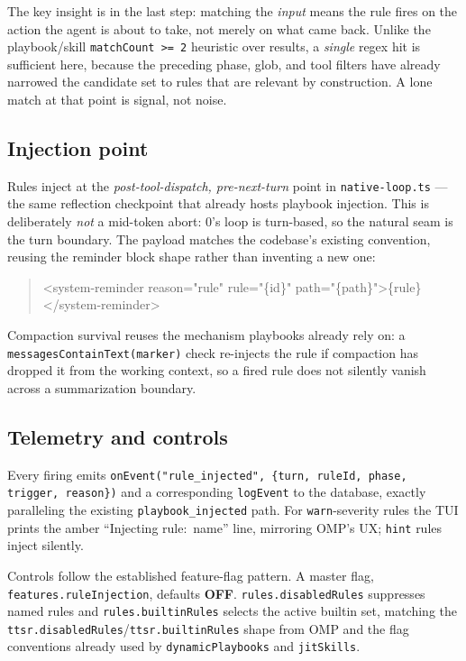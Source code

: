 \documentclass[11pt]{article}
\begin{document}
The key insight is in the last step: matching the \emph{input} means the rule
fires on the action the agent is about to take, not merely on what came back.
Unlike the playbook/skill \texttt{matchCount >= 2} heuristic over results, a
\emph{single} regex hit is sufficient here, because the preceding phase, glob, and
tool filters have already narrowed the candidate set to rules that are relevant
by construction. A lone match at that point is signal, not noise.

\subsection{Injection point}

Rules inject at the \emph{post-tool-dispatch, pre-next-turn} point in
\texttt{native-loop.ts} --- the same reflection checkpoint that already hosts
playbook injection. This is deliberately \emph{not} a mid-token abort: 0's
loop is turn-based, so the natural seam is the turn boundary. The payload matches
the codebase's existing convention, reusing the reminder block shape rather than
inventing a new one:

\begin{quote}\ttfamily
<system-reminder reason="rule" rule="\{id\}" path="\{path\}">\{rule\}</system-reminder>
\end{quote}

Compaction survival reuses the mechanism playbooks already rely on: a
\texttt{messagesContainText(marker)} check re-injects the rule if compaction has
dropped it from the working context, so a fired rule does not silently vanish
across a summarization boundary.

\subsection{Telemetry and controls}

Every firing emits \texttt{onEvent("rule\_injected", \{turn, ruleId, phase,
trigger, reason\})} and a corresponding \texttt{logEvent} to the database,
exactly paralleling the existing \texttt{playbook\_injected} path. For
\texttt{warn}-severity rules the TUI prints the amber ``Injecting rule:
\guillemotright{}\,name'' line, mirroring OMP's UX; \texttt{hint} rules inject
silently.

Controls follow the established feature-flag pattern. A master flag,
\texttt{features.ruleInjection}, defaults \textbf{OFF}. \texttt{rules.disabledRules}
suppresses named rules and \texttt{rules.builtinRules} selects the active builtin
set, matching the \texttt{ttsr.disabledRules}/\texttt{ttsr.builtinRules} shape from
OMP and the flag conventions already used by \texttt{dynamicPlaybooks} and
\texttt{jitSkills}.
\end{document}
